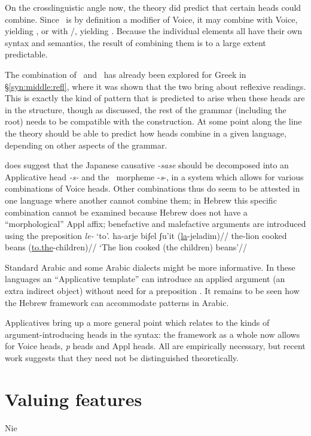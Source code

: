 On the crosslinguistic angle now, the theory did predict that certain heads could combine. Since \va~is by definition a modifier of Voice, it may combine with Voice, yielding \tpie, or with \vz/\pz, yielding \thit. Because the individual elements all have their own syntax and semantics, the result of combining them is to a large extent predictable.

The combination of \vz~and \va~has already been explored for Greek in \S\ref{syn:middle:refl}, where it was shown that the two bring about reflexive readings. This is exactly the kind of pattern that is predicted to arise when these heads are in the structure, though as discussed, the rest of the grammar (including the root) needs to be compatible with the construction. At some point along the line the theory should be able to predict how heads combine in a given language, depending on other aspects of the grammar.

\cite{oseki16nyu} does suggest that the Japanese causative \emph{-sase} should be decomposed into an Applicative head \emph{-s-} and the \vd~morpheme -\emph{s}-{, in a system which allows for various combinations of Voice heads}. Other combinations thus do seem to be attested in one language where another cannot combine them; in Hebrew this {specific }combination cannot be examined because Hebrew does not have a ``morphological'' Appl affix; benefactive and malefactive arguments are introduced using the preposition \emph{le-} `to'.
\ex \begingl
    \gla ha-arje biʃel ʃu'it (\underline{la}-jeladim)//
    \glb the-lion cooked beans (\underline{to.the}-children)//
    \glft `The lion cooked (the children) beans'//
    \endgl
\xe

Standard Arabic and some Arabic dialects might be more informative. In these languages an ``Applicative template'' can introduce an applied argument (an extra indirect object) without need for a preposition \citep{alkaabi12}. It remains to be seen how the Hebrew framework can accommodate patterns in Arabic.

Applicatives bring up a more general point which relates to the kinds of argument-introducing heads in the syntax: the framework as a whole now allows for Voice heads, \emph{p} heads and Appl heads. All are empirically necessary, but recent work suggests that they need not be distinguished theoretically.

\section{Valuing features} \label{i:nie}
Nie



